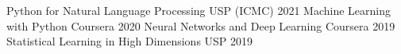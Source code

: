 
\begin{cvhonors}

  \cvhonor
    {Python for Natural Language Processing}
    {USP (ICMC)}
    {}
    {2021}
  \cvhonor
    {Machine Learning with Python}
    {Coursera}
    {}
    {2020}
  \cvhonor
    {Neural Networks and Deep Learning}
    {Coursera}
    {}
    {2019}
  \cvhonor
    {Statistical Learning in High Dimensions}
    {USP}
    {}
    {2019}

    

\end{cvhonors}
